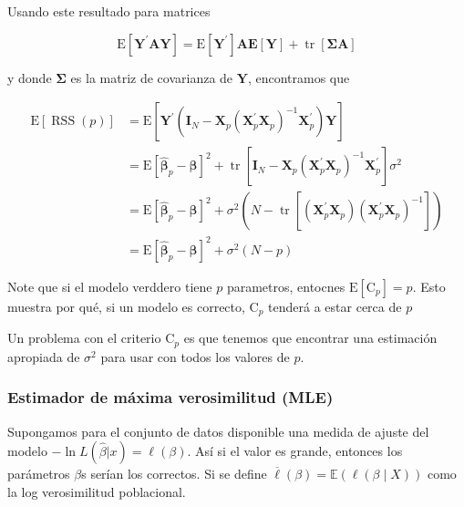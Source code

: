 \documentclass[
  12pt,
]{book}
\theoremstyle{definition}
\theoremstyle{definition}
\theoremstyle{definition}
\theoremstyle{definition}
\theoremstyle{remark}
\begin{document}
Usando este resultado para matrices

\begin{equation*}
\mathrm{E}\left[\mathbf{Y}^{\prime} \mathbf{A Y}\right]=\mathrm{E}\left[\mathbf{Y}^{\prime}\right] \mathbf{A E}[\mathbf{Y}]+\operatorname{tr}[\mathbf{\Sigma} \mathbf{A}]
\end{equation*}

y donde \(\boldsymbol{\Sigma}\) es la matriz de covarianza de \(\mathbf{Y}\), encontramos que

\begin{equation*}
\begin{aligned}
\mathrm{E}[\operatorname{RSS}(p)] &=\mathrm{E}\left[\mathbf{Y}^{\prime}\left(\mathbf{I}_{N}-\mathbf{X}_{p}\left(\mathbf{X}_{p}^{\prime} \mathbf{X}_{p}\right)^{-1} \mathbf{X}_{p}^{\prime}\right) \mathbf{Y}\right] \\
&=\mathrm{E}\left[\hat{\boldsymbol{\beta}}_{p}-\boldsymbol{\beta}\right]^{2}+\operatorname{tr}\left[\mathbf{I}_{N}-\mathbf{X}_{p}\left(\mathbf{X}_{p}^{\prime} \mathbf{X}_{p}\right)^{-1} \mathbf{X}_{p}^{\prime}\right] \sigma^{2} \\
&=\mathrm{E}\left[\hat{\boldsymbol{\beta}}_{p}-\boldsymbol{\beta}\right]^{2}+\sigma^{2}\left(N-\operatorname{tr}\left[\left(\mathbf{X}_{p}^{\prime} \mathbf{X}_{p}\right)\left(\mathbf{X}_{p}^{\prime} \mathbf{X}_{p}\right)^{-1}\right]\right) \\
&=\mathrm{E}\left[\hat{\boldsymbol{\beta}}_{p}-\boldsymbol{\beta}\right]^{2}+\sigma^{2}(N-p)
\end{aligned}
\end{equation*}

Note que si el modelo verddero tiene \(p\) parametros, entocnes \(\mathrm{E}\left[\mathrm{C}_{p}\right]=p\). Esto muestra por qué, si un modelo es correcto, \(\mathrm{C}_{p}\) tenderá a estar cerca de \(p\)

Un problema con el criterio \(\mathrm{C}_{p}\) es que tenemos que encontrar una estimación apropiada de \(\sigma^{2}\) para usar con todos los valores de \(p\).

\hypertarget{estimador-de-muxe1xima-verosimilitud-mle-1}{%
\subsubsection{Estimador de máxima verosimilitud (MLE)}\label{estimador-de-muxe1xima-verosimilitud-mle-1}}

Supongamos para el conjunto de datos disponible una medida de ajuste del modelo \(-\ln L(\hat{\beta} | x)=\ell(\beta)\). Así si el valor es grande, entonces los parámetros \(\beta\)s serían los correctos. Si se define \(\overline{\ell}(\beta)=\mathbb{E}(\ell(\beta\mid X))\) como la log verosimilitud poblacional.
\end{document}
